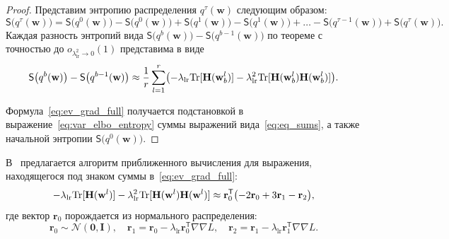 \begin{proof} Представим энтропию распределения $q^\tau(\mathbf{w})$ следующим образом:
\[
\mathsf{S}\bigl(q^\tau(\mathbf{w})\bigr) = \mathsf{S}\bigl(q^0(\mathbf{w})\bigr) - \mathsf{S}\bigl(q^0(\mathbf{w})\bigr) + \mathsf{S}\bigl(q^1(\mathbf{w})\bigr) - \mathsf{S}\bigl(q^1(\mathbf{w})\bigr) +\dots -
\mathsf{S}\bigl(q^{\tau-1}(\mathbf{w})\bigr) + \mathsf{S}\bigl(q^\tau(\mathbf{w})\bigr).
\]
Каждая разность энтропий вида $\mathsf{S}\bigl(q^b(\mathbf{w})\bigr) - \mathsf{S}\bigl(q^{b-1}(\mathbf{w})\bigr)$ по теореме с точностью до $o_{\lambda_{\text{lr}}^2 \to 0}(1)$ представима в виде
\begin{equation}
\label{eq:eq_sums}
	\mathsf{S}\bigl(q^b(\mathbf{w})\bigr) -  \mathsf{S}\bigl(q^{b-1}(\mathbf{w})\bigr)  \approx  \frac{1}{r}\sum_{l=1}^r \bigl(-\lambda_{\text{lr}} \textnormal{Tr}[\mathbf{H}(\mathbf{w}_b^l)] - \lambda_{\text{lr}}^2 \textnormal{Tr}[\mathbf{H}(\mathbf{w}_b^l)\mathbf{H}(\mathbf{w}_b^l)]  \bigr).
\end{equation}

Формула~\eqref{eq:ev_grad_full} получается подстановкой в выражение~\eqref{eq:var_elbo_entropy} суммы выражений вида~\eqref{eq:eq_sums}, а также начальной энтропии $\mathsf{S}\bigl(q^0(\mathbf{w}))$.
\end{proof}

В~\cite{early} предлагается алгоритм приближенного вычисления для выражения, находящегося под знаком суммы в~\eqref{eq:ev_grad_full}:
\[
	-\lambda_{\text{lr}} \textnormal{Tr}[\mathbf{H}(\mathbf{w}^l)] - \lambda_{\text{lr}}^2 \textnormal{Tr}[\mathbf{H}(\mathbf{w}^l)\mathbf{H}(\mathbf{w}^l)]  \approx \mathbf{r}_0^\mathsf{T}\bigl(-2\mathbf{r}_0 + 3\mathbf{r}_1 -\mathbf{r}_2\bigr),
\]
где вектор $\mathbf{r}_0$  порождается из нормального распределения:
$$\mathbf{r}_0 \sim \mathcal{N}(\mathbf{0}, \mathbf{I}), \quad \mathbf{r}_1 = \mathbf{r}_0 - \lambda_{\text{lr}} \mathbf{r}_0^\mathsf{T} \nabla \nabla L, \quad \mathbf{r}_2 = \mathbf{r}_1 - \lambda_{\text{lr}} \mathbf{r}_1^\mathsf{T} \nabla \nabla L.$$


